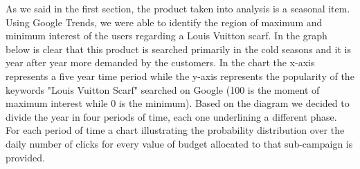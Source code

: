 As we said in the first section, the product taken into analysis is a seasonal item. Using Google Trends, we were able to identify the region of maximum and minimum interest of the users regarding a Louis Vuitton scarf. In the graph below is clear that this product is searched primarily in the cold seasons and it is year after year more demanded by the customers. In the chart the x-axis represents a five year time period while the y-axis represents the popularity of the keywords "Louis Vuitton Scarf" searched on Google (100 is the moment of maximum interest while 0 is the minimum).
Based on the diagram we decided to divide the year in four periods of time, each one underlining a different phase.\newline\\
For each period of time a chart illustrating the probability distribution over the daily number of clicks for every value of budget allocated to that sub-campaign is provided.\newline
{} 
